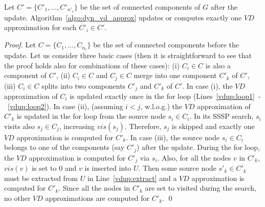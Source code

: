 \documentclass[english]{llncs}
\newcommand{\vd}{$\mathit{VD}$\xspace}
\begin{document}
\begin{lemma}
\label{thm:dyn_vd_correctness}
Let $C' = \{C'_1,...,C'_{n'_c}\}$ be the set of connected components of $G$ after the update. Algorithm~\ref{algo:dyn_vd_approx} updates or computes exactly one \vd approximation for each $C'_i \in C'$.
\end{lemma}
\begin{proof}
Let $C = \{C_1,...,C_{n_c}\}$ be the set of connected components before the update. Let us consider three basic cases (then it is straightforward to see that the proof holds also for combinations of these cases): (i) $C_i \in C$ is also a component of $C'$, (ii) $C_i \in C$ and $C_j \in C$ merge into one component $C'_k$ of $C'$, (iii) $C_i \in C$ splits into two components $C'_j$ and $C'_k$ of $C'$. In case (i), the \vd approximation of $C_i$ is updated exactly once in the for loop (Lines~\ref{vdup:loop1}~-~\ref{vdup:loop2}). In case (ii), (assuming $i<j$, w.l.o.g.) the \vd approximation of $C'_k$ is updated in the for loop from the source node $s_i \in C_i$. In its SSSP search, $s_i$ visits also $s_j \in C_j$, increasing $vis(s_j)$. Therefore, $s_j$ is skipped and exactly one \vd approximation is computed for $C'_k$. In case (iii), the source node $s_i \in C_i$ belongs to one of the components (say $C'_j$) after the update. During the for loop, the \vd approximation is computed for $C'_j$ via $s_i$. Also, for all the nodes $v$ in $C'_k$, $vis(v)$ is set to 0 and $v$ is inserted into $U$. Then some source node $s'_k \in C'_k$ must be extracted from $U$ in Line~\ref{vdup:extract} and a \vd approximation is computed for $C'_k$. Since all the nodes in $C'_k$ are set to visited during the search, no other \vd approximations are computed for $C'_k$.
 \qed
\end{proof}
\end{document}
